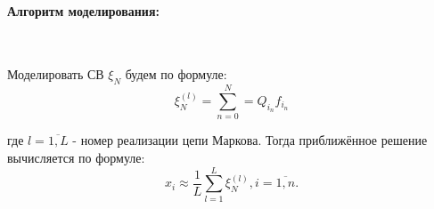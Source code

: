 \paragraph{Алгоритм моделирования:}\
\

Моделировать СВ $\xi_{N}$ будем по формуле:
\begin{equation}
\xi_{N}^{(l)}=\sum\limits_{n=0}^{N}=Q_{i_{n}}f_{i_{n}}
\end{equation}

где $l=\overline{1,L}$ - номер реализации цепи Маркова. Тогда приближённое решение вычисляется по формуле:
\begin{equation}
x_{i} \approx \frac{1}{L}\sum\limits_{l=1}^{L}\xi_{N}^{(l)}, i = \overline{1,n}.
\end{equation}
